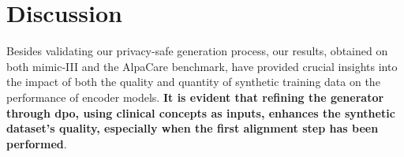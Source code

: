 \begin{table}[h]
\centering
{}%
\caption{Detailed results on the AlpaCare benchmark by evaluator model (win rates). Our methods' averages are in bold. Best performances are underlined.}
\label{tab:alpacare_detailed_results}
\end{table}

\section{Discussion}

Besides validating our privacy-safe generation process, our results, obtained on both \gls{mimic}-III and the AlpaCare benchmark, have provided crucial insights into the impact of both the quality and quantity of synthetic training data on the performance of encoder models. \textbf{It is evident that refining the generator through \gls{dpo}, using clinical concepts as inputs, enhances the synthetic dataset's quality, especially when the first alignment step has been performed}.

